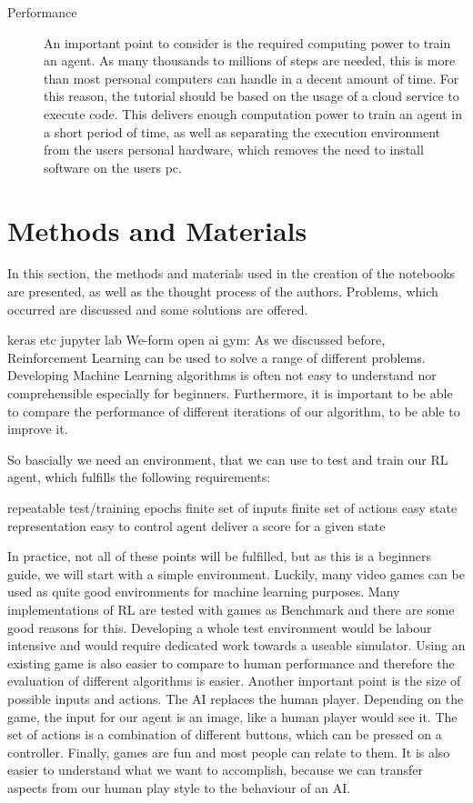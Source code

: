 \documentclass[a4paper]{article}
\begin{document}
\begin{description}
			\item[Performance] An important point to consider is the required computing power to train an agent. As many thousands to millions of steps are needed, this is more than most personal computers can handle in a decent amount of time.  
			For this reason, the tutorial should be based on the usage of a cloud service to execute code. 
			This delivers enough computation power to train an agent in a short period of time, as well as separating the execution environment from the users personal hardware, which removes the need to install software on the users pc.
		\end{description}

	\section{Methods and Materials}
		In this section, the methods and materials used in the creation of the notebooks are presented, as well as the thought process of the authors. Problems, which occurred are discussed and some solutions are offered.
		
		
	keras etc
	jupyter lab
	We-form
	open ai gym: 
		As we discussed before, Reinforcement Learning can be used to solve a range of different problems. Developing Machine Learning algorithms is often not easy to understand nor comprehensible especially for beginners. Furthermore, it is important to be able to compare the performance of different iterations of our algorithm, to be able to improve it.
		
		So bascially we need an environment, that we can use to test and train our RL agent, which fulfills the following requirements:
		
		repeatable test/training epochs
		finite set of inputs
		finite set of actions
		easy state representation
		easy to control agent
		deliver a score for a given state
		
		In practice, not all of these points will be fulfilled, but as this is a beginners guide, we will start with a simple environment. Luckily, many video games can be used as quite good environments for machine learning purposes. Many implementations of RL are tested with games as Benchmark and there are some good reasons for this. Developing a whole test environment would be labour intensive and would require dedicated work towards a useable simulator. Using an existing game is also easier to compare to human performance and therefore the evaluation of different algorithms is easier. Another important point is the size of possible inputs and actions. The AI replaces the human player. Depending on the game, the input for our agent is an image, like a human player would see it. The set of actions is a combination of different buttons, which can be pressed on a controller. Finally, games are fun and most people can relate to them. It is also easier to understand what we want to accomplish, because we can transfer aspects from our human play style to the behaviour of an AI. 
\end{document}
